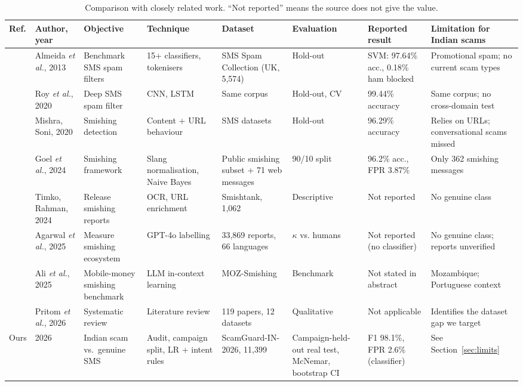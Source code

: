 \documentclass[conference]{IEEEtran}
\begin{document}
\begin{table}[t]
\centering
\caption{Comparison with closely related work. ``Not reported'' means the source does not give the value.}
\label{tab:lit}
\scriptsize
\setlength{\tabcolsep}{3pt}
\renewcommand{\arraystretch}{1.1}
\begin{tabular}{@{}p{0.55cm}p{1.75cm}p{2.4cm}p{2.2cm}p{2.4cm}p{1.9cm}p{2.1cm}p{2.6cm}@{}}
\toprule
Ref. & Author, year & Objective & Technique & Dataset & Evaluation & Reported result & Limitation for Indian scams \\
\midrule
\cite{almeida2013towards} & Almeida \textit{et al.}, 2013 & Benchmark SMS spam filters & 15+ classifiers, tokenisers & SMS Spam Collection (UK, 5,574) & Hold-out & SVM: 97.64\% acc., 0.18\% ham blocked & Promotional spam; no current scam types \\
\cite{roy2020deep} & Roy \textit{et al.}, 2020 & Deep SMS spam filter & CNN, LSTM & Same corpus & Hold-out, CV & 99.44\% accuracy & Same corpus; no cross-domain test \\
\cite{mishra2020smishing} & Mishra, Soni, 2020 & Smishing detection & Content + URL behaviour & SMS datasets & Hold-out & 96.29\% accuracy & Relies on URLs; conversational scams missed \\
\cite{goel2024ml} & Goel \textit{et al.}, 2024 & Smishing framework & Slang normalisation, Naive Bayes & Public smishing subset + 71 web messages & 90/10 split & 96.2\% acc., FPR 3.87\% & Only 362 smishing messages \\
\cite{timko2024smishing} & Timko, Rahman, 2024 & Release smishing reports & OCR, URL enrichment & Smishtank, 1,062 & Descriptive & Not reported & No genuine class \\
\cite{agarwal2025fishing} & Agarwal \textit{et al.}, 2025 & Measure smishing ecosystem & GPT-4o labelling & 33,869 reports, 66 languages & $\kappa$ vs. humans & Not reported (no classifier) & No genuine class; reports unverified \\
\cite{ali2025moz} & Ali \textit{et al.}, 2025 & Mobile-money smishing benchmark & LLM in-context learning & MOZ-Smishing & Benchmark & Not stated in abstract & Mozambique; Portuguese context \\
\cite{pritom2026sms} & Pritom \textit{et al.}, 2026 & Systematic review & Literature review & 119 papers, 12 datasets & Qualitative & Not applicable & Identifies the dataset gap we target \\
\midrule
Ours & 2026 & Indian scam vs.\ genuine SMS & Audit, campaign split, LR + intent rules & ScamGuard-IN-2026, 11,399 & Campaign-held-out real test, McNemar, bootstrap CI & F1 98.1\%, FPR 2.6\% (classifier) & See Section~\ref{sec:limits} \\
\bottomrule
\end{tabular}
\end{table}
\end{document}
